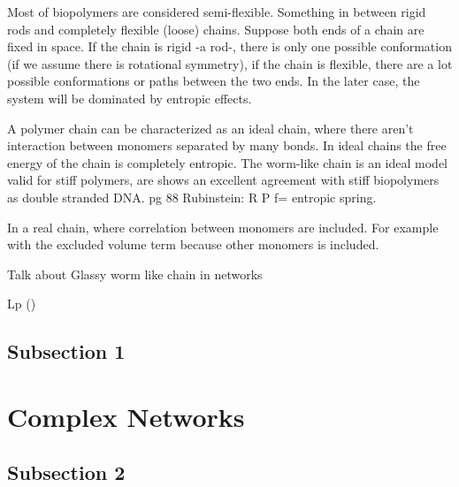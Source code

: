 Most of biopolymers are considered semi-flexible. Something in between
rigid rods and completely flexible (loose) chains. Suppose both ends of a chain
are fixed in space. If the chain is rigid -a rod-, there is only one possible conformation
(if we assume there is rotational symmetry), if the chain is flexible, there
are a lot possible conformations or paths between the two ends. In the later
case, the system will be dominated by entropic effects.

A polymer chain can be characterized as an ideal chain, where there aren't
interaction between monomers separated by many bonds. In ideal chains the free
energy of the chain is completely entropic. The worm-like chain is an ideal
model valid for stiff polymers, are shows an excellent agreement with stiff
biopolymers as double stranded DNA.
 pg 88 Rubinstein:
R
P
f= entropic spring.

In a real chain, where correlation between monomers are included.
For example with the excluded volume term because other monomers is included.


Talk about Glassy worm like chain in networks


\gls{Lp}  
 (\citet{storm_nonlinear_2005})
\citet{stein_algorithm_2008}



\subsection{Subsection 1}






\section{Complex Networks}

\subsection{Subsection 2}